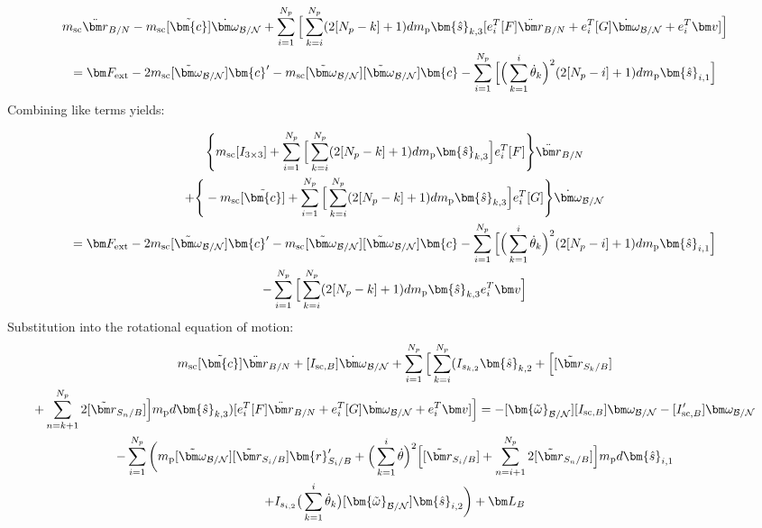 \begin{multline}
	m_{\textnormal{sc}} \ddot{\bm r}_{B/N}-m_{\textnormal{sc}} [\tilde{\bm{c}}]\dot{\bm\omega}_{\cal B/N}+\sum^{N_p}_{i=1} \Big[ \sum^{N_p}_{k=i} (2[N_p-k]+1) d m_{\text{p}} \bm{\hat{s}}_{k,3} [e_{i}^T[F] \ddot{\bm r}_{B/N} + e_{i}^T[G]\dot{\bm\omega}_{\cal B/N} + e_{i}^T\bm v] \Big] \\
	= \bm F_{\textnormal{ext}} - 2 m_{\textnormal{sc}} [\tilde{\bm\omega}_{\cal B/N}]\bm{c}'
	- m_{\textnormal{sc}} [\tilde{\bm\omega}_{\cal B/N}][\tilde{\bm\omega}_{\cal B/N}]\bm{c}-\sum^{N_p}_{i=1} \Big[ \Big(\sum^{i}_{k=1}\dot{\theta}_k\Big)^2 (2[N_p-i]+1) d m_{\text{p}} \bm{\hat{s}}_{i,1} \Big]
	\label{eq:Rbddot5}
\end{multline}
Combining like terms yields:

\begin{multline}
	\Bigg \lbrace m_{\textnormal{sc}}[I_{3\times 3}] + \sum^{N_p}_{i=1} \Big[\sum^{N_p}_{k=i} (2[N_p-k]+1) d m_{\text{p}} \bm{\hat{s}}_{k,3}\Big] e_{i}^T[F] \Bigg \rbrace \ddot{\bm r}_{B/N}
	\\
	+ \Bigg \lbrace -m_{\textnormal{sc}} [\tilde{\bm{c}}]  + \sum^{N_p}_{i=1} \Big[\sum^{N_p}_{k=i} (2[N_p-k]+1) d m_{\text{p}} \bm{\hat{s}}_{k,3}\Big] e_{i}^T[G]\Bigg \rbrace \dot{\bm\omega}_{\cal B/N}\\
	=  \bm F_{\textnormal{ext}} - 2 m_{\textnormal{sc}} [\tilde{\bm\omega}_{\cal B/N}]\bm{c}'
	- m_{\textnormal{sc}} [\tilde{\bm\omega}_{\cal B/N}][\tilde{\bm\omega}_{\cal B/N}]\bm{c}-\sum^{N_p}_{i=1} \Big[ \Big(\sum^{i}_{k=1}\dot{\theta}_k\Big)^2 (2[N_p-i]+1) d m_{\text{p}} \bm{\hat{s}}_{i,1} \Big]\\
	- \sum^{N_p}_{i=1} \Big[\sum^{N_p}_{k=i} (2[N_p-k]+1) d m_{\text{p}} \bm{\hat{s}}_{k,3} e_{i}^T \bm v \Big]
	\label{eq:Rbddot6}
\end{multline}
Substitution into the rotational equation of motion:
\begin{multline}
	m_{\text{sc}}[\tilde{\bm{c}}]\ddot{\bm r}_{B/N} + [I_{\text{sc},B}] \dot{\bm\omega}_{\cal B/N} + \sum\limits_{i=1}^{N_p} \Big[ \sum^{N_p}_{k=i} (I_{s_{k,2}} \bm{\hat{s}}_{k,2} + \Big[ [\tilde{{\bm r}}_{S_{k}/B}] \\
	+ \sum\limits_{n=k+1}^{N_p}2[\tilde{{\bm r}}_{S_{n}/B}]\Big]m_{\text{p}} d \bm{\hat{s}}_{k,3} ) [e_{i}^T[F] \ddot{\bm r}_{B/N} + e_{i}^T[G]\dot{\bm\omega}_{\cal B/N} + e_{i}^T\bm v]\Big]
	= -[\bm{\tilde{\omega}}_{\cal B/N}] [I_{\text{sc},B}] \bm\omega_{\cal B/N} - [I'_{\text{sc},B}] \bm\omega_{\cal B/N} \\
	- \sum\limits_{i=1}^{N_p}\bigg( m_{\text{p}} [\tilde{\bm\omega}_{\cal B/N}] [\tilde{{\bm r}}_{S_{i}/B}] \bm{r}'_{S_i/B} + \Big( \sum\limits_{k=1}^{i} \dot{\theta}\Big)^2 \Big[[\tilde{{\bm r}}_{S_{i}/B}] + \sum\limits_{n=i+1}^{N_p}2[\tilde{{\bm r}}_{S_{n}/B}]\Big] m_{\text{p}} d \bm{\hat{s}}_{i,1}\\
	+ I_{s_{i,2}} \big(\sum^{i}_{k=1}\dot{\theta}_k\big) [\bm{\tilde{\omega}}_{\cal B/N}] \bm{\hat{s}}_{i,2} \bigg) + \bm L_B
	\label{eq:Final7sub}
\end{multline}
